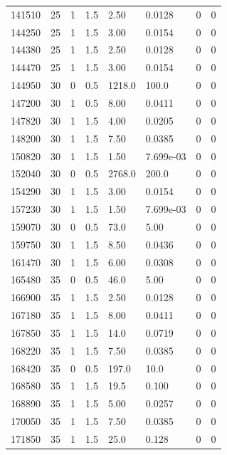 \documentclass[preview]{standalone}
\begin{document}
{{{{{{\begin{tabular}{L{1.2cm}C{1.2cm} C{0.3cm}C{0.5cm} C{1.4cm}C{1.4cm} C{1.4cm}C{1.4cm}}
  141510  &    25  & 1     & 1.5 &  2.50  & 0.0128  & 0 &  0   \\ 
  144250  &    25  & 1     & 1.5 &  3.00  & 0.0154  & 0 &  0   \\ 
  144380  &    25  & 1     & 1.5 &  2.50  & 0.0128  & 0 &  0   \\ 
  144470  &    25  & 1     & 1.5 &  3.00  & 0.0154  & 0 &  0   \\ 
  144950  &    30  & 0     & 0.5 &  1218.0  & 100.0  & 0 &  0   \\ 
  147200  &    30  & 1     & 0.5 &  8.00  & 0.0411  & 0 &  0   \\ 
  147820  &    30  & 1     & 1.5 &  4.00  & 0.0205  & 0 &  0   \\ 
  148200  &    30  & 1     & 1.5 &  7.50  & 0.0385  & 0 &  0   \\ 
  150820  &    30  & 1     & 1.5 &  1.50  & 7.699e-03  & 0 &  0   \\ 
  152040  &    30  & 0     & 0.5 &  2768.0  & 200.0  & 0 &  0   \\ 
  154290  &    30  & 1     & 1.5 &  3.00  & 0.0154  & 0 &  0   \\ 
  157230  &    30  & 1     & 1.5 &  1.50  & 7.699e-03  & 0 &  0   \\ 
  159070  &    30  & 0     & 0.5 &  73.0  & 5.00  & 0 &  0   \\ 
  159750  &    30  & 1     & 1.5 &  8.50  & 0.0436  & 0 &  0   \\ 
  161470  &    30  & 1     & 1.5 &  6.00  & 0.0308  & 0 &  0   \\ 
  165480  &    35  & 0     & 0.5 &  46.0  & 5.00  & 0 &  0   \\ 
  166900  &    35  & 1     & 1.5 &  2.50  & 0.0128  & 0 &  0   \\ 
  167180  &    35  & 1     & 1.5 &  8.00  & 0.0411  & 0 &  0   \\ 
  167850  &    35  & 1     & 1.5 &  14.0  & 0.0719  & 0 &  0   \\ 
  168220  &    35  & 1     & 1.5 &  7.50  & 0.0385  & 0 &  0   \\ 
  168420  &    35  & 0     & 0.5 &  197.0  & 10.0  & 0 &  0   \\ 
  168580  &    35  & 1     & 1.5 &  19.5  & 0.100  & 0 &  0   \\ 
  168890  &    35  & 1     & 1.5 &  5.00  & 0.0257  & 0 &  0   \\ 
  170050  &    35  & 1     & 1.5 &  7.50  & 0.0385  & 0 &  0   \\ 
  171850  &    35  & 1     & 1.5 &  25.0  & 0.128  & 0 &  0   \\ 
\hline 
\end{tabular} 

}}}}}}
\end{document}
